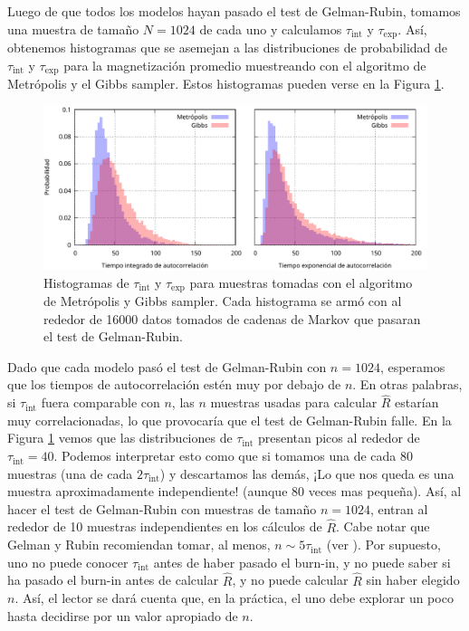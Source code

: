 \documentclass[a4paper, 12pt]{article}
\newcommand{\tauint}{\tau_\text{int}}
\newcommand{\tauexp}{\tau_\text{exp}}
\begin{document}
Luego de que todos los modelos hayan pasado el test de Gelman-Rubin, tomamos una muestra de tamaño $N = 1024$ de cada uno y calculamos $\tauint$ y $\tauexp$. Así, obtenemos histogramas que se asemejan a las distribuciones de probabilidad de $\tauint$ y $\tauexp$ para la magnetización promedio muestreando con el algoritmo de Metrópolis y el Gibbs sampler. Estos histogramas pueden verse en la Figura \ref{fig::hist}.

\begin{figure}[h!]
    \centering
    \includegraphics[width = \textwidth]{../img/hist.pdf}
    \caption{Histogramas de $\tauint$ y $\tauexp$ para muestras tomadas con el algoritmo de Metrópolis y Gibbs sampler. Cada histograma se armó con al rededor de 16000 datos tomados de cadenas de Markov que pasaran el test de Gelman-Rubin.}
    \label{fig::hist}
\end{figure}

Dado que cada modelo pasó el test de Gelman-Rubin con $n = 1024$, esperamos que los tiempos de autocorrelación estén muy por debajo de $n$. En otras palabras, si $\tauint$ fuera comparable con $n$, las $n$ muestras usadas para calcular $\hat{R}$ estarían muy correlacionadas, lo que provocaría que el test de Gelman-Rubin falle. En la Figura \ref{fig::hist} vemos que las distribuciones de $\tauint$ presentan picos al rededor de $\tauint = 40$. Podemos interpretar esto como que si tomamos una de cada 80 muestras (una de cada $2\tauint$) y descartamos las demás, ¡Lo que nos queda es una muestra aproximadamente independiente! (aunque 80 veces mas pequeña). Así, al hacer el test de Gelman-Rubin con muestras de tamaño $n = 1024$, entran al rededor de 10 muestras independientes en los cálculos de $\hat{R}$. Cabe notar que Gelman y Rubin recomiendan tomar, al menos, $n \sim 5\tauint$ (ver \cite[Capítulo 11]{gelman2013bayesian}). Por supuesto, uno no puede conocer $\tauint$ antes de haber pasado el burn-in, y no puede saber si ha pasado el burn-in antes de calcular $\hat{R}$, y no puede calcular $\hat{R}$ sin haber elegido $n$. Así, el lector se dará cuenta que, en la práctica, el uno debe explorar un poco hasta decidirse por un valor apropiado de $n$.\\
\end{document}
